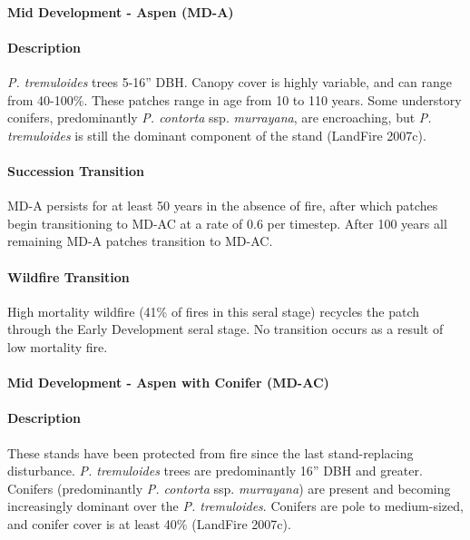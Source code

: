 \noindent\hrulefill


\paragraph{Mid Development - Aspen (MD-A)}

\paragraph{Description} \emph{P. tremuloides} trees 5-16'' DBH. Canopy cover is highly variable, and can range from 40-100\%. These patches range in age from 10 to 110 years. Some understory conifers, predominantly \emph{P. contorta} ssp. \emph{murrayana}, are encroaching, but \emph{P. tremuloides} is still the dominant component of the stand (LandFire 2007c).

\paragraph{Succession Transition} MD-A persists for at least 50 years in the absence of fire, after which patches begin transitioning to MD-AC at a rate of 0.6 per timestep. After 100 years all remaining MD-A patches transition to MD-AC. 

\paragraph{Wildfire Transition} High mortality wildfire (41\% of fires in this seral stage) recycles the patch through the Early Development seral stage. No transition occurs as a result of low mortality fire.

\noindent\hrulefill

\paragraph{Mid Development - Aspen with Conifer (MD-AC)}

\paragraph{Description} These stands have been protected from fire since the last stand-replacing disturbance. \emph{P. tremuloides} trees are predominantly 16'' DBH and greater. Conifers (predominantly \emph{P. contorta} ssp. \emph{murrayana}) are present and becoming increasingly dominant over the \emph{P. tremuloides}. Conifers are pole to medium-sized, and conifer cover is at least 40\% (LandFire 2007c).

